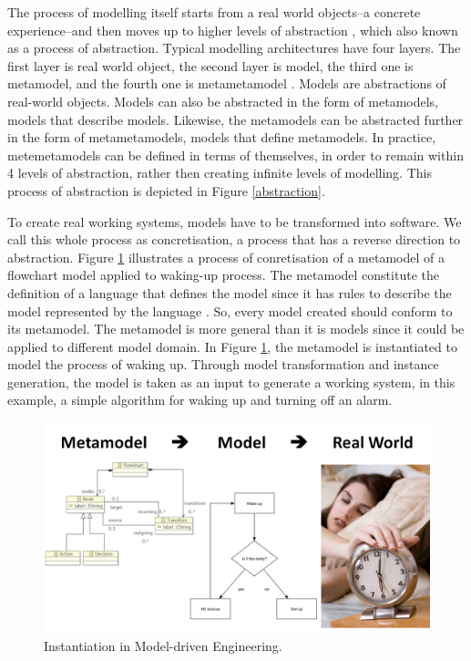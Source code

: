 \documentclass[12pt, a4paper]{report}
\begin{document}
{The process of modelling itself starts from a real world objects--a concrete experience--and then moves up to higher levels of abstraction \cite{white2010teaching, engels2005teaching}, which also known as a process of abstraction. Typical modelling architectures have four layers. The first layer is real world object, the second layer is model, the third one is metamodel, and the fourth one is metametamodel \cite{brambilla2012model}. Models are abstractions of real-world objects. Models can also be abstracted in the form of metamodels, models that describe models. Likewise, the metamodels can be abstracted further in the form of metametamodels, models that define metamodels. In practice, metemetamodels can be defined in terms of themselves, in order to remain within 4 levels of abstraction, rather then creating infinite levels of modelling. This process of abstraction is depicted in Figure \ref{abstraction}.
 
To create real working systems, models have to be transformed into software. We call this whole process as concretisation, a process that has a reverse direction to abstraction. Figure \ref{concretisation} illustrates a process of conretisation of a metamodel of a flowchart model applied to waking-up process. The metamodel constitute the definition of a language that defines the model since it has rules to describe the model represented by the language \cite{brambilla2012model}. So, every model created should conform to its metamodel. The metamodel is more general than it is models since it could be applied to different model domain. In Figure \ref{concretisation}, the metamodel is instantiated to model the process of waking up. Through model transformation and instance generation, the model is taken as an input to generate a working system, in this example, a simple algorithm for waking up and turning off an alarm.   

\begin{figure}[!b]
\centering
\includegraphics[width=13cm]{concretisation}
\caption{Instantiation in Model-driven Engineering.}
\label{concretisation}
\end{figure}
   
}
\end{document}
